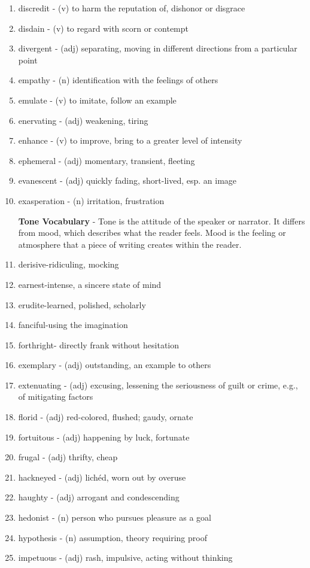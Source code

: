 \documentclass[12pt]{book}
\begin{document}
\begin{enumerate}
\item discredit - (v) to harm the reputation of, dishonor or disgrace
\item disdain - (v) to regard with scorn or contempt
\item divergent - (adj) separating, moving in different directions from a particular point
\item empathy - (n) identification with the feelings of others
\item emulate - (v) to imitate, follow an example
\item enervating - (adj) weakening, tiring
\item enhance - (v) to improve, bring to a greater level of intensity
\item ephemeral - (adj) momentary, transient, fleeting
\item evanescent - (adj) quickly fading, short-lived, esp. an image
\item exasperation - (n) irritation, frustration

\bigskip
\textbf{Tone Vocabulary} - Tone is the attitude of the speaker or narrator.  It differs from mood, which describes what the reader feels.  Mood is the feeling or atmosphere that a piece of writing creates within the reader.  


\item derisive-ridiculing, mocking
\item earnest-intense, a sincere state of mind
\item erudite-learned, polished, scholarly
\item fanciful-using the imagination
\item forthright- directly frank without hesitation 

\bigskip
\item exemplary - (adj) outstanding, an example to others
\item extenuating - (adj) excusing, lessening the seriousness of guilt or crime, e.g., of mitigating factors
\item florid - (adj) red-colored, flushed; gaudy, ornate
\item fortuitous - (adj) happening by luck, fortunate
\item frugal - (adj) thrifty, cheap
\item hackneyed - (adj)  lichéd, worn out by overuse
\item haughty - (adj) arrogant and condescending
\item hedonist - (n) person who pursues pleasure as a goal
\item hypothesis - (n) assumption, theory requiring proof
\item impetuous - (adj) rash, impulsive, acting without thinking


\end{enumerate}
\end{document}
